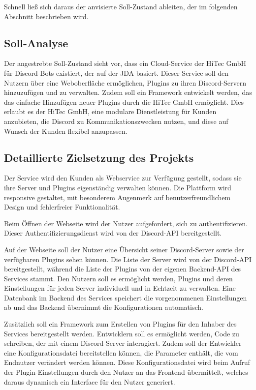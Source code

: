 Schnell ließ sich daraus der anvisierte Soll-Zustand ableiten, der im folgenden Abschnitt beschrieben wird.

\subsection{Soll-Analyse}\label{soll-analyse}
Der angestrebte Soll-Zustand sieht vor, dass ein Cloud-Service der HiTec GmbH für Discord-Bots existiert, der auf der \gls{JDA} \autocite{jda-github,jda-wiki} basiert. Dieser Service soll den Nutzern über eine Weboberfläche ermöglichen, Plugins zu ihren Discord-Servern hinzuzufügen und zu verwalten. Zudem soll ein Framework entwickelt werden, das das einfache Hinzufügen neuer Plugins durch die HiTec GmbH ermöglicht. Dies erlaubt es der HiTec GmbH, eine modulare Dienstleistung für Kunden anzubieten, die Discord zu Kommunikationszwecken nutzen, und diese auf Wunsch der Kunden flexibel anzupassen.

\subsection{Detaillierte Zielsetzung des Projekts}\label{projektziel-detailliert}
Der Service wird den Kunden als Webservice zur Verfügung gestellt, sodass sie ihre Server und Plugins eigenständig verwalten können. Die Plattform wird responsive gestaltet, mit besonderem Augenmerk auf benutzerfreundlichem Design und fehlerfreier Funktionalität.

Beim Öffnen der Webseite wird der Nutzer aufgefordert, sich zu authentifizieren. Dieser Authentifizierungsdienst wird von der Discord-API bereitgestellt.

Auf der Webseite soll der Nutzer eine Übersicht seiner Discord-Server sowie der verfügbaren Plugins sehen können. Die Liste der Server wird von der Discord-API bereitgestellt, während die Liste der Plugins von der eigenen Backend-API des Services stammt. Den Nutzern soll es ermöglicht werden, Plugins und deren Einstellungen für jeden Server individuell und in Echtzeit zu verwalten. Eine Datenbank im Backend des Services speichert die vorgenommenen Einstellungen ab und das Backend übernimmt die Konfigurationen automatisch.

Zusätzlich soll ein Framework zum Erstellen von Plugins für den Inhaber des Services bereitgestellt werden. Entwicklern soll es ermöglicht werden, Code zu schreiben, der mit einem Discord-Server interagiert. Zudem soll der Entwickler eine Konfigurationsdatei bereitstellen können, die Parameter enthält, die vom Endnutzer verändert werden können. Diese Konfigurationsdatei wird beim Aufruf der Plugin-Einstellungen durch den Nutzer an das Frontend übermittelt, welches daraus dynamisch ein Interface für den Nutzer generiert.

